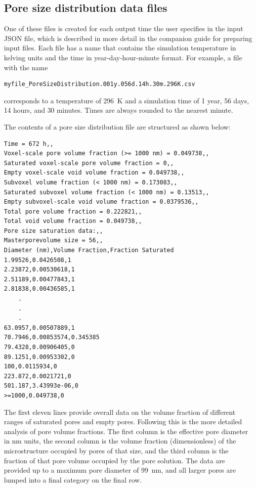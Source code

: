 \documentclass{article}
\begin{document}
{\subsection{Pore size distribution data files}
One of these files is created for each output time the user specifies in the
input JSON file, which is described in more detail in the companion guide
for preparing input files. Each file has a name that contains the
simulation temperature in kelving units and the time in year-day-hour-minute format.
For example, a file with the name
\scriptsize{
	\begin{lstlisting}
myfile_PoreSizeDistribution.001y.056d.14h.30m.296K.csv
\end{lstlisting}
}
\normalsize{ }
corresponds to a temperature of \qty{296}{\kelvin} and
a simulation time of 1 year, 56 days, 14 hours, and 30 minutes.
Times are always rounded to the nearest minute.

The contents of a pore size distribution file are structured
as shown below:
\scriptsize{
	\begin{lstlisting}
Time = 672 h,,
Voxel-scale pore volume fraction (>= 1000 nm) = 0.049738,,
Saturated voxel-scale pore volume fraction = 0,,
Empty voxel-scale void volume fraction = 0.049738,,
Subvoxel volume fraction (< 1000 nm) = 0.173083,,
Saturated subvoxel volume fraction (< 1000 nm) = 0.13513,,
Empty subvoxel-scale void volume fraction = 0.0379536,,
Total pore volume fraction = 0.222821,,
Total void volume fraction = 0.049738,,
Pore size saturation data:,,
Masterporevolume size = 56,,
Diameter (nm),Volume Fraction,Fraction Saturated
1.99526,0.0426508,1
2.23872,0.00530618,1
2.51189,0.00477843,1
2.81838,0.00436585,1
    .
    .
    .
63.0957,0.00507889,1
70.7946,0.00853574,0.345385
79.4328,0.00906405,0
89.1251,0.00953302,0
100,0.0115934,0
223.872,0.0021721,0
501.187,3.43993e-06,0
>=1000,0.049738,0
\end{lstlisting}
}

\normalsize{ }
The first eleven lines provide overall data on the volume fraction of different
ranges of saturated pores and empty pores. Following this is the more detailed
analysis of pore volume fractions. The first column is the effective
pore diameter in  \unit{\nano\meter} units, the second column is the
volume fraction (dimensionless) of the microstructure occupied by pores of that size,
and the third column is the fraction of that pore volume occupied by the
pore solution. The data are provided up to a maximum pore diameter of
\qty{99}{\nano\meter}, and all larger pores are lumped into a final category
on the final row.

}
\end{document}
